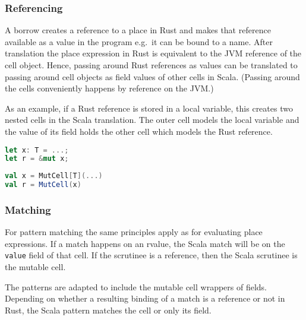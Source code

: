 \subsubsection{Referencing}

A borrow creates a reference to a place in Rust and makes that reference
available as a value in the program e.g.~it can be bound to a name.
After translation the place expression in Rust is equivalent to the JVM
reference of the cell object. Hence, passing around Rust references as
values can be translated to passing around cell objects as field values
of other cells in Scala. (Passing around the cells conveniently happens
by reference on the JVM.)

As an example, if a Rust reference is stored in a local variable, this
creates two nested cells in the Scala translation. The outer cell models
the local variable and the value of its field holds the other cell which
models the Rust reference.

\noindent\begin{minipage}[t]{.45\textwidth}
\begin{lstlisting}[language=Rust]
let x: T = ...;
let r = &mut x;
\end{lstlisting}
\end{minipage}\hfill
\begin{minipage}[t]{.45\textwidth}
\begin{lstlisting}[language=Scala]
val x = MutCell[T](...)
val r = MutCell(x)
\end{lstlisting}
\end{minipage}

\subsubsection{\texorpdfstring{\textbf{Matching}}{Matching}}

For pattern matching the same principles apply as for evaluating place
expressions. If a match happens on an rvalue, the Scala match will be on
the \passthrough{\lstinline!value!} field of that cell. If the scrutinee
is a reference, then the Scala scrutinee is the mutable cell.

The patterns are adapted to include the mutable cell wrappers of fields.
Depending on whether a resulting binding of a match is a reference or
not in Rust, the Scala pattern matches the cell or only its field.

